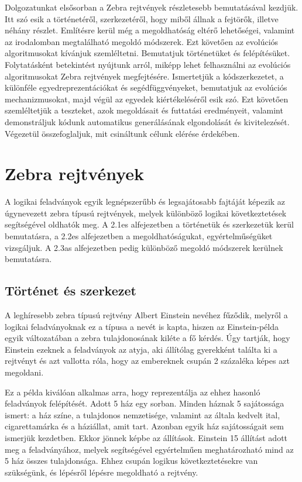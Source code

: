 \documentclass[12ppt,a4paper,oneside]{report}
\begin{document}
	Dolgozatunkat elsősorban a Zebra rejtvények részletesebb bemutatásával kezdjük.
    Itt szó esik a történetéről, szerkezetéről, hogy miből állnak a fejtörők, illetve néhány részlet.
    Említésre kerül még a megoldhatóság eltérő lehetőségei, valamint az irodalomban megtalálható megoldó módszerek. Ezt követően az evolúciós algoritmusokat kívánjuk szemléltetni.
    Bemutatjuk történetüket és felépítésüket.
    Folytatásként betekintést nyújtunk arról, miképp lehet felhasználni az evolúciós algoritmusokat Zebra rejtvények megfejtésére.
    Ismertetjük a kódszerkezetet, a különféle egyedreprezentációkat és segédfüggvényeket, bemutatjuk az evolúciós mechanizmusokat, majd végül az egyedek kiértékeléséről esik szó.
    Ezt követően szemléltetjük a teszteket, azok megoldásait és futtatási eredményeit, valamint demonstráljuk kódunk automatikus generálásának elgondolását és kivitelezését.
    Végezetül összefoglaljuk, mit csináltunk célunk elérése érdekében.

\chapter{Zebra rejtvények} %

	A logikai feladványok egyik legnépszerűbb és legsajátosabb fajtáját képezik az úgynevezett zebra típusú rejtvények, melyek különböző logikai következtetések segítségével oldhatók meg. A 2.1es alfejezetben a történetük és szerkezetük kerül bemutatásra, a 2.2es alfejezetben a megoldhatóságukat, egyértelműségüket vizsgáljuk. A 2.3as alfejezetben pedig különböző megoldó módszerek kerülnek bemutatásra.
    
    \section{Történet és szerkezet} %

A leghíresebb zebra típusú rejtvény Albert Einstein nevéhez fűződik, melyről a logikai feladványoknak ez a típusa a nevét is kapta, hiszen az Einstein-példa egyik változatában a zebra tulajdonosának kiléte a fő kérdés. Úgy tartják, hogy Einstein ezeknek a feladványok az atyja, aki állítólag gyerekként találta ki a rejtvényt és azt vallotta róla, hogy az embereknek csupán 2 százaléka képes azt megoldani.

Ez a példa kiválóan alkalmas arra, hogy reprezentálja az ehhez hasonló feladványok felépítését. Adott 5 ház egy sorban. Minden háznak 5 sajátossága ismert: a ház színe, a tulajdonos nemzetisége, valamint az általa kedvelt ital, cigarettamárka és a háziállat, amit tart. Azonban egyik ház sajátosságait sem ismerjük kezdetben. Ekkor jönnek képbe az állítások. Einstein 15 állítást adott meg a feladványához, melyek segítségével egyértelműen meghatározható mind az 5 ház összes tulajdonsága. Ehhez csupán logikus következtetésekre van szükségünk, és lépésről lépésre megoldható a rejtvény.
\end{document}
